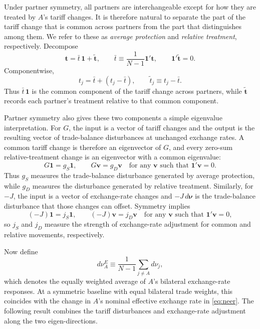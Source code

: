 \documentclass[11pt]{article}
\begin{document}
Under partner symmetry, all partners are interchangeable except for how they are treated by $A$'s tariff changes. It is therefore natural to separate the part of the tariff change that is common across partners from the part that distinguishes among them. We refer to these as \emph{average protection} and \emph{relative treatment}, respectively. Decompose
\begin{equation}
\mathbf{t}=\bar t\,\mathbf{1}+\widetilde{\mathbf{t}}, \qquad \bar t\equiv\frac{1}{N-1}\mathbf{1}'\mathbf{t}, \qquad \mathbf{1}'\widetilde{\mathbf{t}}=0.
\label{eq:t-split}
\end{equation}
Componentwise,
\begin{equation}
t_j=\bar t+(t_j-\bar t), \qquad \tilde t_j\equiv t_j-\bar t.
\end{equation}
Thus $\bar t\,\mathbf{1}$ is the common component of the tariff change across partners, while $\widetilde{\mathbf{t}}$ records each partner's treatment relative to that common component.

Partner symmetry also gives these two components a simple eigenvalue interpretation. For $G$, the input is a vector of tariff changes and the output is the resulting vector of trade-balance disturbances at unchanged exchange rates. A common tariff change is therefore an eigenvector of $G$, and every zero-sum relative-treatment change is an eigenvector with a common eigenvalue:
\[
G\mathbf{1}=g_S\mathbf{1}, \qquad G\mathbf{v}=g_D\mathbf{v} \quad \text{for any } \mathbf{v} \text{ such that } \mathbf{1}'\mathbf{v}=0.
\]
Thus $g_S$ measures the trade-balance disturbance generated by average protection, while $g_D$ measures the disturbance generated by relative treatment. Similarly, for $-J$, the input is a vector of exchange-rate changes and $-J\,d\boldsymbol{\nu}$ is the trade-balance disturbance that those changes can offset. Symmetry implies
\[
(-J)\mathbf{1}=j_S\mathbf{1}, \qquad (-J)\mathbf{v}=j_D\mathbf{v} \quad \text{for any } \mathbf{v} \text{ such that } \mathbf{1}'\mathbf{v}=0,
\]
so $j_S$ and $j_D$ measure the strength of exchange-rate adjustment for common and relative movements, respectively.

Now define
\[
d\nu_A^E\equiv\frac{1}{N-1}\sum_{j\neq A}d\nu_j,
\]
which denotes the equally weighted average of $A$'s bilateral exchange-rate responses. At a symmetric baseline with equal bilateral trade weights, this coincides with the change in $A$'s nominal effective exchange rate in \eqref{eq:neer}. The following result combines the tariff disturbances and exchange-rate adjustment along the two eigen-directions.
\end{document}
